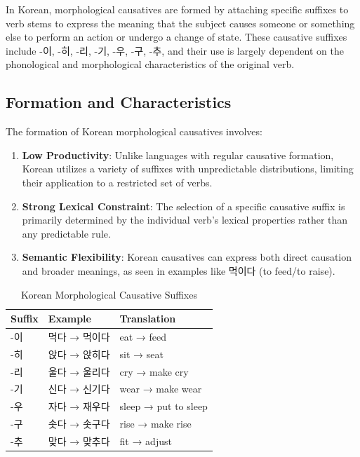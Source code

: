 \documentclass[12pt,a4paper]{article}
\begin{document}
In Korean, morphological causatives are formed by attaching specific suffixes to verb stems to express the meaning that the subject causes someone or something else to perform an action or undergo a change of state. These causative suffixes include -이, -히, -리, -기, -우, -구, -추, and their use is largely dependent on the phonological and morphological characteristics of the original verb.

\subsection{Formation and Characteristics}

The formation of Korean morphological causatives involves:

\begin{enumerate}
\item \textbf{Low Productivity}: Unlike languages with regular causative formation, Korean utilizes a variety of suffixes with unpredictable distributions, limiting their application to a restricted set of verbs.

\item \textbf{Strong Lexical Constraint}: The selection of a specific causative suffix is primarily determined by the individual verb's lexical properties rather than any predictable rule.

\item \textbf{Semantic Flexibility}: Korean causatives can express both direct causation and broader meanings, as seen in examples like 먹이다 (to feed/to raise).
\end{enumerate}

\begin{table}[h]
\centering
\caption{Korean Morphological Causative Suffixes}
\begin{tabular}{|l|l|l|}
\hline
\textbf{Suffix} & \textbf{Example} & \textbf{Translation} \\
\hline
-이 & 먹다 → 먹이다 & eat → feed \\
-히 & 앉다 → 앉히다 & sit → seat \\
-리 & 울다 → 울리다 & cry → make cry \\
-기 & 신다 → 신기다 & wear → make wear \\
-우 & 자다 → 재우다 & sleep → put to sleep \\
-구 & 솟다 → 솟구다 & rise → make rise \\
-추 & 맞다 → 맞추다 & fit → adjust \\
\hline
\end{tabular}
\end{table}
\end{document}
